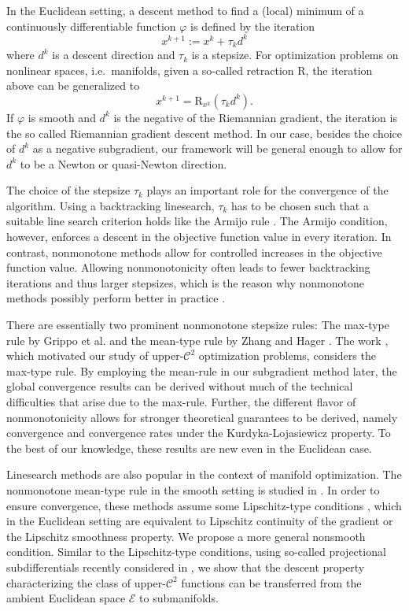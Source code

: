 \documentclass[a4paper, 12pt]{article}
\numberwithin{equation}{section}
\theoremstyle{bolddef}
\theoremstyle{definition}
\theoremstyle{boldplain}
\newcommand{\xk}{x^k}
\newcommand{\dk}{d^k}
\newcommand{\tauk}{\tau_k}
\newcommand{\xkp}{x^{k+1}}
\newcommand{\X}{\mathcal{E}}
\newcommand{\retr}{\mathrm{R}}
\begin{document}
In the Euclidean setting, a descent method to find a (local) minimum of a continuously differentiable function $ \varphi $ is defined by the iteration
\begin{equation}\label{eq:opt-iteration}
	\xkp := \xk + \tau_k \dk
\end{equation}
where $\dk$ is a descent direction and $\tau_k$ is a stepsize. For optimization problems on nonlinear spaces, i.e.\ manifolds, given a so-called retraction $\retr$, the iteration above can be generalized to
\begin{equation*}
	\xkp = \retr_{\xk}(\tauk \dk).
\end{equation*}
If $\varphi$ is smooth and $\dk$ is the negative of the Riemannian gradient, the iteration is the so called Riemannian gradient descent method. In our case, besides the choice of $\dk$ as a negative subgradient, our framework will be general enough to allow for $\dk$ to be a Newton or quasi-Newton direction. 

The choice of the stepsize $\tauk$ plays an important role for the convergence of the algorithm. Using a backtracking linesearch, $\tauk$ has to be chosen such that a suitable line search criterion holds like the Armijo rule \cite{Armijo1966}. The Armijo condition, however, enforces a descent in the objective function value in every iteration. In contrast, nonmonotone methods allow for controlled increases in the objective function value. Allowing nonmonotonicity often leads to fewer backtracking iterations and thus larger stepsizes, which is the reason why nonmonotone methods possibly perform better in practice \cite{aragon2025, BirginMartinezRaydan2000, DeMarchi2023}.

There are essentially two prominent nonmonotone stepsize rules: The max-type rule by Grippo et al. \cite{GrippoLamparielloLucidi1986} and the mean-type rule by Zhang and Hager \cite{ZhangHager2004}. The work \cite{aragon2025}, which motivated our study of upper-$\mathcal{C}^2$ optimization problems, considers the max-type rule. By employing the mean-rule in our subgradient method later, the global convergence results can be derived without much of the technical difficulties that arise due to the max-rule. Further, the different flavor of nonmonotonicity allows for stronger theoretical guarantees to be derived, namely convergence and convergence rates under the Kurdyka-Lojasiewicz property. To the best of our knowledge, these results are new even in the Euclidean case.

Linesearch methods are also popular in the context of manifold optimization. The nonmonotone mean-type rule in the smooth setting is studied in \cite{Oviedo2022, Qian2024}. In order to ensure convergence, these methods assume some Lipschitz-type conditions \cite{Boumal2018}, which in the Euclidean setting are equivalent to Lipschitz continuity of the gradient or the Lipschitz smoothness property. We propose a more general nonsmooth condition. Similar to the Lipschitz-type conditions, using so-called projectional subdifferentials recently considered in \cite{Khanh2026}, we show that the descent property characterizing the class of upper-$\mathcal{C}^2$ functions can be transferred from the ambient Euclidean space $\X$ to submanifolds.
\end{document}
